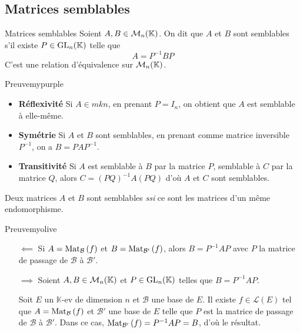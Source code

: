 \subsection{Matrices semblables}

    \begin{defitheo}{Matrices semblables}{}
        Soient $A,B \in \mathcal{M}_{n}(\mathbb{K})$. On dit que $A$ et $B$ sont semblables s’il existe $P \in \operatorname{GL}_n(\mathbb{K})$ telle que 
        \[ A = P^{-1} B P \]   
        C’est une relation d’équivalence sur $\mathcal{M}_{n}(\mathbb{K})$.
    \end{defitheo}

    \begin{demo}{Preuve}{mypurple}
        \begin{itemize}
            \item \textbf{Réflexivité} \quad Si $A \in mk{n}$, en prenant $P = I_n$, on obtient que $A$ est semblable à elle-même.
            \item \textbf{Symétrie} \quad Si $A$ et $B$ sont semblables, en prenant comme matrice inversible $P^{-1}$, on a $B = P A P^{-1}$.
            \item \textbf{Transitivité} \quad Si $A$ est semblable à $B$ par la matrice $P$, semblable à $C$ par la matrice $Q$, alors $C = (PQ)^{-1} A (PQ)$ d’où $A$ et $C$ sont semblables.
        \end{itemize}
    \end{demo}

    \begin{prop}{}{}
        Deux matrices $A$ et $B$ sont semblables \textit{ssi} ce sont les matrices d’un même endomorphisme.
    \end{prop}

    \begin{demo}{Preuve}{myolive}
        \begin{itemize}
            \item[\textcolor{myolive}{$\impliedby$}] Si $A = \text{Mat}_{\mathcal{B}}\left(f\right)$ et $B = \text{Mat}_{\mathcal{B}'}\left(f\right)$, alors $B = P^{-1} A P$ avec $P$ la matrice de passage de $\mathcal{B}$ à $\mathcal{B}'$.
            \item[\textcolor{myolive}{$\implies$}] Soient $A,B \in \mathcal{M}_{n}(\mathbb{K})$ et $P \in \operatorname{GL}_n(\mathbb{K})$ telles que $B = P^{-1} A P$.
            
            Soit $E$ un $\mathbb{K}$-ev de dimension $n$ et $\mathcal{B}$ une base de $E$. Il existe $f \in \mathcal{L}(E)$ tel que $A = \text{Mat}_{\mathcal{B}}\left(f\right)$ et $\mathcal{B}'$ une base de $E$ telle que $P$ est la matrice de passage de $\mathcal{B}$ à $\mathcal{B}'$. Dans ce cas, $\text{Mat}_{\mathcal{B}'}\left(f\right) = P^{-1} A P = B$, d’où le résultat.
        \end{itemize}
    \end{demo}

